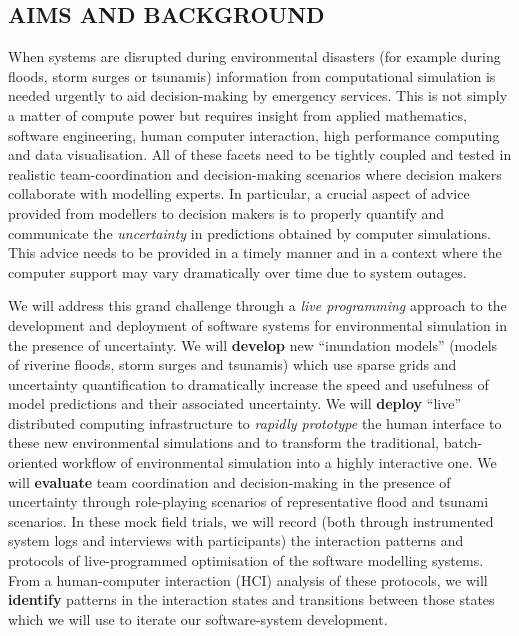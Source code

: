 \subsection*{AIMS AND BACKGROUND}

When systems are disrupted during environmental disasters (for example
during floods, storm surges or tsunamis) information from
computational simulation is needed urgently to aid decision-making by
emergency services. This is not simply a matter of compute power but
requires insight from applied mathematics, software
engineering, human computer interaction, high performance computing
and data visualisation. All of these facets need to be tightly coupled
and tested in realistic team-coordination and decision-making
scenarios where decision makers collaborate with modelling experts. In
particular, a crucial aspect of advice provided from modellers to
decision makers is to properly quantify and communicate the
\emph{uncertainty} in predictions obtained by computer simulations.
This advice needs to be provided in a timely manner and in a context
where the computer support may vary dramatically over time due to
system outages.

We will address this grand challenge through a \emph{live programming}
approach to the development and deployment of software systems for
environmental simulation in the presence of uncertainty. We will
\textbf{develop} new ``inundation models'' (models of riverine floods,
storm surges and tsunamis) which use sparse grids and uncertainty
quantification to dramatically increase the speed and usefulness of
model predictions and their associated uncertainty. We will
\textbf{deploy} ``live'' distributed computing infrastructure to
\emph{rapidly prototype} the human interface to these new
environmental simulations and to transform the traditional,
batch-oriented workflow of environmental simulation into a highly
interactive one. We will \textbf{evaluate} team coordination and
decision-making in the presence of uncertainty through role-playing
scenarios of representative flood and tsunami scenarios. In these mock
field trials, we will record (both through instrumented system logs
and interviews with participants) the interaction patterns and
protocols of live-programmed optimisation of the software modelling
systems. From a human-computer interaction (HCI) analysis of these
protocols, we will \textbf{identify} patterns in the interaction
states and transitions between those states which we will use to
iterate our software-system development.

